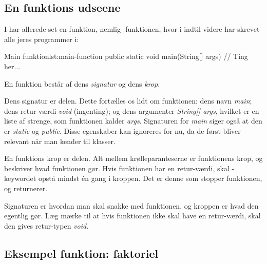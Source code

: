 

	\subsection{En funktions udseene}

		I har allerede set en funktion, nemlig -funktionen, hvor i
		indtil videre har skrevet alle jeres programmer i:

		\begin{JavaCode}{Main funktion}{lst:main-function}
			public static void main(String[] args) {
				// Ting her...
			}
		\end{JavaCode}

		En funktion består af dens \emph{signatur} og dens \emph{krop}.

        Dens signatur er 
        delen.  Dette fortælles os lidt om funktionen: dens
        navn \emph{main}; dens retur-værdi \emph{void} (ingenting); og
        dens argumenter \emph{String[] args}, hvilket er en liste af
        strenge, som funktionen kalder \emph{args}.  Signaturen for
        \emph{main} siger også at den er \emph{static} og
        \emph{public}. Disse egenskaber kan ignoreres for nu, da de
        først bliver relevant når man kender til klasser.

		En funktions krop er  delen. Alt mellem
		krølleparanteserne er funktionens krop, og beskriver hvad funktionen gør.
		Hvis funktionen har en retur-værdi, skal -keywordet opstå
		mindst én gang i kroppen. Det er denne som stopper funktionen, og returnerer.

        Signaturen er hvordan man skal snakke med funktionen, og
        kroppen er hvad den egentlig gør. Læg mærke til at hvis
        funktionen ikke skal have en retur-værdi, skal den gives
        retur-typen \emph{void}.

	\subsection{Eksempel funktion: faktoriel}

